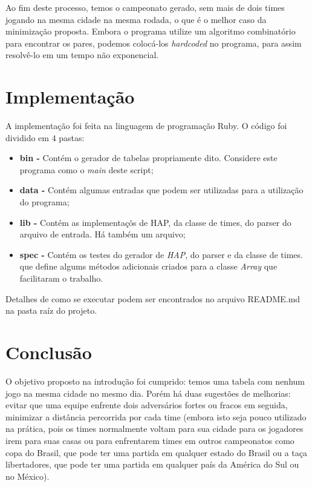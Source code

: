 \documentclass[a4paper,12pt,titlepage]{article}
\begin{document}
Ao fim deste processo, temos o campeonato gerado, sem mais de dois times jogando na mesma cidade na mesma rodada, o que é o 
melhor caso da minimização proposta. Embora o programa utilize um algoritmo combinatório para encontrar os pares, podemos
colocá-los \emph{hardcoded} no programa, para assim resolvê-lo em um tempo não exponencial. 

\section{Implementação}

A implementação foi feita na linguagem de programação Ruby. O código foi dividido em $4$ pastas:
\begin{itemize}
	\item \textbf{bin -} Contém o gerador de tabelas propriamente dito. Considere este programa como o \emph{main} deste script;
	\item \textbf{data -} Contém algumas entradas que podem ser utilizadas para a utilização do programa; 
	\item \textbf{lib -} Contém as implementaçõs de HAP, da classe de times, do parser do arquivo de entrada. Há também um arquivo;
	\item \textbf{spec -} Contém os testes do gerador de \emph{HAP}, do parser e da classe de times.
que define algums métodos adicionais criados para a classe \emph{Array} que facilitaram o trabalho.
\end{itemize}

Detalhes de como se executar podem ser encontrados no arquivo README.md na pasta raíz do projeto. 


\section{Conclusão}

O objetivo proposto na introdução foi cumprido: temos uma tabela com nenhum jogo na mesma cidade no mesmo dia. Porém há duas 
sugestões de melhorias: evitar que uma equipe enfrente dois adversários fortes ou fracos em seguida, minimizar a distância percorrida
por cada time (embora isto seja pouco utilizado na prática, pois os times normalmente voltam para sua cidade para os
jogadores irem para suas casas ou para enfrentarem times em outros campeonatos como copa do Brasil, que pode ter uma partida
em qualquer estado do Brasil ou a taça libertadores, que pode ter uma partida em qualquer país da América do Sul ou no México).



\end{document}

